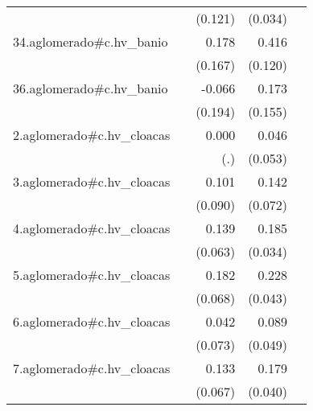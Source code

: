 {\begin{longtable}{l*{4}{D{.}{.}{-1}}}
            &                     &     (0.121)         &     (0.034)         &                     \\
\addlinespace
34.aglomerado#c.hv\_banio&                     &       0.178         &       0.416\sym{***}&                     \\
            &                     &     (0.167)         &     (0.120)         &                     \\
\addlinespace
36.aglomerado#c.hv\_banio&                     &      -0.066         &       0.173         &                     \\
            &                     &     (0.194)         &     (0.155)         &                     \\
\addlinespace
2.aglomerado#c.hv\_cloacas&                     &       0.000         &       0.046         &                     \\
            &                     &         (.)         &     (0.053)         &                     \\
\addlinespace
3.aglomerado#c.hv\_cloacas&                     &       0.101         &       0.142\sym{*}  &                     \\
            &                     &     (0.090)         &     (0.072)         &                     \\
\addlinespace
4.aglomerado#c.hv\_cloacas&                     &       0.139\sym{*}  &       0.185\sym{***}&                     \\
            &                     &     (0.063)         &     (0.034)         &                     \\
\addlinespace
5.aglomerado#c.hv\_cloacas&                     &       0.182\sym{**} &       0.228\sym{***}&                     \\
            &                     &     (0.068)         &     (0.043)         &                     \\
\addlinespace
6.aglomerado#c.hv\_cloacas&                     &       0.042         &       0.089         &                     \\
            &                     &     (0.073)         &     (0.049)         &                     \\
\addlinespace
7.aglomerado#c.hv\_cloacas&                     &       0.133\sym{*}  &       0.179\sym{***}&                     \\
            &                     &     (0.067)         &     (0.040)         &                     \\

\end{longtable}}
